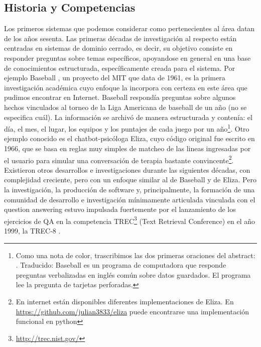 \subsection{Historia y Competencias}
\label{subsec:historia}
\label{subsec:competencias}
Los primeros sistemas que podemos considerar como pertenecientes al área datan de los años sesenta. Las primeras décadas de investigación al respecto están centradas en sistemas de dominio cerrado, es decir, su objetivo consiste en responder preguntas sobre temas específicos, apoyandose en general en una base de conocimientos estructurada, específicamente creada para el sistema. Por ejemplo Baseball \cite{BASEBALL}, un proyecto del MIT que data de 1961, es la primera investigación académica cuyo enfoque la incorpora con certeza en este área que pudimos encontrar en Internet. Baseball respondía preguntas sobre algunos hechos vinculados al torneo de la Liga Americana de baseball de un año (no se especifica cuál). La información se archivó de manera estructurada y contenía: el día, el mes, el lugar, los equipos y los puntajes de cada juego por un año\footnote{Como una nota de color, trascribimos las dos primeras oraciones del abstract: . Traducido: Baseball es un programa de computadora que responde preguntas verbalizadas en inglés común sobre datos guardados. El programa lee la pregunta de tarjetas perforadas.}. Otro ejemplo conocido es el chatbot-psicóloga Eliza, cuyo código original fue escrito en 1966, que se basa en reglas muy simples de matcheo de las lineas ingresadas por el usuario para simular una conversación de terapia bastante convincente\footnote{En internet están disponibles diferentes implementaciones de Eliza. En \url{https://github.com/julian3833/eliza} puede encontrarse una implementación funcional en python}. Existieron otros desarrollos e investigaciones durante las siguientes décadas, con complejidad creciente, pero con un enfoque similar al de Baseball y de Eliza. Pero la investigación, la producción de software y, principalmente, la formación de una comunidad de desarrollo e investigación mínimamente articulada vinculada con el question answering estuvo impulsada fuertemente por el lanzamiento de los ejercicios de QA en la competencia TREC\footnote{\url{http://trec.nist.gov/}} (Text Retrieval Conference) en el año 1999, la TREC-8 \cite{TREC8}.

